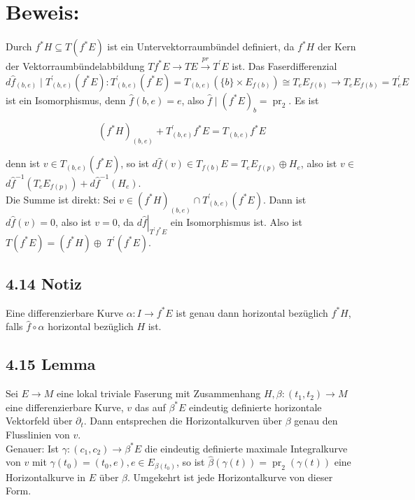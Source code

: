 \section*{Beweis:}
Durch $f^{*} H \subseteq T\left(f^{*} E\right)$ ist ein Untervektorraumbündel definiert, da $f^{*} H$ der Kern der Vektorraumbündelabbildung $T f^{*} E \rightarrow T E \xrightarrow{p r} T^{\prime} E$ ist. Das Faserdifferenzial\\
$d \hat{f}_{(b, e)} \mid T_{(b, e)}^{\prime}\left(f^{*} E\right): T_{(b, e)}^{\prime}\left(f^{*} E\right)=T_{(b, e)}\left(\{b\} \times E_{f(b)}\right) \cong T_{e} E_{f(b)} \rightarrow T_{e} E_{f(b)}=T_{e}^{\prime} E$\\
ist ein Isomorphismus, denn $\hat{f}(b, e)=e$, also $\hat{f} \mid\left(f^{*} E\right)_{b}=\operatorname{pr}_{2}$. Es ist

$$
\left(f^{*} H\right)_{(b, e)}+T_{(b, e)}^{\prime} f^{*} E=T_{(b, e)} f^{*} E
$$

denn ist $v \in T_{(b, e)}\left(f^{*} E\right)$, so ist $d \hat{f}(v) \in T_{f(b)} E=T_{e} E_{f(p)} \oplus H_{e}$, also ist $v \in$ $d \hat{f}^{-1}\left(T_{e} E_{f(p)}\right)+d \hat{f}^{-1}\left(H_{e}\right)$.\\
Die Summe ist direkt: Sei $v \in\left(f^{*} H\right)_{(b, e)} \cap T_{(b, e)}^{\prime}\left(f^{*} E\right)$. Dann ist $d \hat{f}(v)=0$, also ist $v=0$, da $\left.d \hat{f}\right|_{T^{\prime} f^{*} E}$ ein Isomorphismus ist. Also ist $T\left(f^{*} E\right)=\left(f^{*} H\right) \oplus$ $T^{\prime}\left(f^{*} E\right)$.

\subsection*{4.14 Notiz}
Eine differenzierbare Kurve $\alpha: I \rightarrow f^{*} E$ ist genau dann horizontal bezüglich $f^{*} H$, falls $\hat{f} \circ \alpha$ horizontal bezüglich $H$ ist.

\subsection*{4.15 Lemma}
Sei $E \rightarrow M$ eine lokal triviale Faserung mit Zusammenhang $H, \beta:\left(t_{1}, t_{2}\right) \rightarrow M$ eine differenzierbare Kurve, $v$ das auf $\beta^{*} E$ eindeutig definierte horizontale Vektorfeld über $\partial_{t}$. Dann entsprechen die Horizontalkurven über $\beta$ genau den Flusslinien von $v$.\\
Genauer: Ist $\gamma:\left(c_{1}, c_{2}\right) \rightarrow \beta^{*} E$ die eindeutig definierte maximale Integralkurve von $v$ mit $\gamma\left(t_{0}\right)=\left(t_{0}, e\right), e \in E_{\beta\left(t_{0}\right)}$, so ist $\hat{\beta}(\gamma(t))=\operatorname{pr}_{2}(\gamma(t))$ eine Horizontalkurve in $E$ über $\beta$. Umgekehrt ist jede Horizontalkurve von dieser Form.


